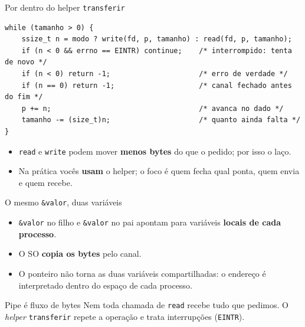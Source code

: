 \documentclass[aspectratio=169]{beamer}
\begin{document}
\begin{frame}[fragile]{Por dentro do helper \texttt{transferir}}
\begin{lstlisting}[style=codigo]
while (tamanho > 0) {
    ssize_t n = modo ? write(fd, p, tamanho) : read(fd, p, tamanho);
    if (n < 0 && errno == EINTR) continue;    /* interrompido: tenta de novo */
    if (n < 0) return -1;                     /* erro de verdade */
    if (n == 0) return -1;                    /* canal fechado antes do fim */
    p += n;                                   /* avanca no dado */
    tamanho -= (size_t)n;                     /* quanto ainda falta */
}
\end{lstlisting}

\small
\begin{itemize}
    \item \texttt{read} e \texttt{write} podem mover \textbf{menos bytes} do que o pedido; por isso o laço.
    \item Na prática vocês \textbf{usam} o helper; o foco é quem fecha qual ponta, quem envia e quem recebe.
\end{itemize}
\end{frame}

\begin{frame}{O mesmo \texttt{\&valor}, duas variáveis}
\begin{itemize}
    \item \texttt{\&valor} no filho e \texttt{\&valor} no pai apontam para variáveis \textbf{locais de cada processo}.
    \item O SO \textbf{copia os bytes} pelo canal.
    \item O ponteiro não torna as duas variáveis compartilhadas: o endereço é interpretado dentro do espaço de cada processo.
\end{itemize}

\vspace{0.6em}
\begin{exampleblock}{Pipe é fluxo de bytes}
Nem toda chamada de \texttt{read} recebe tudo que pedimos. O \emph{helper} \texttt{transferir} repete a operação e trata interrupções (\texttt{EINTR}).
\end{exampleblock}
\end{frame}
\end{document}
